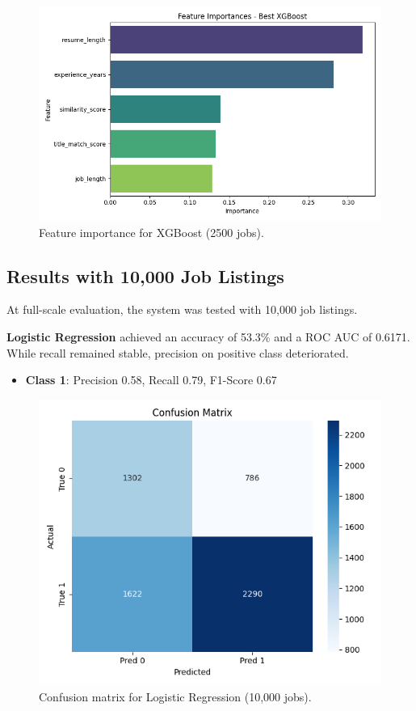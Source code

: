\documentclass[a4paper]{article}
\begin{document}
\begin{multicols}{2}
\begin{figure}[H]
\centering
\includegraphics[width=0.8\linewidth]{Images/featimp_xgb_2500.png}
\caption{Feature importance for XGBoost (2500 jobs).}
\end{figure}

\subsection{Results with 10,000 Job Listings}
At full-scale evaluation, the system was tested with 10,000 job listings.

\textbf{Logistic Regression} achieved an accuracy of 53.3\% and a ROC AUC of 0.6171. While recall remained stable, precision on positive class deteriorated.

\begin{itemize}
    \item \textbf{Class 1}: Precision 0.58, Recall 0.79, F1-Score 0.67
\end{itemize}

\begin{figure}[H]
\centering
\includegraphics[width=0.55\linewidth]{Images/conf_matrix_logreg_10000.png}
\caption{Confusion matrix for Logistic Regression (10,000 jobs).}
\end{figure}


\end{multicols}
\end{document}
